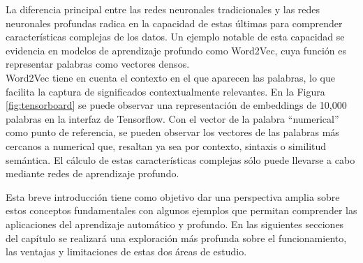 La diferencia principal entre las redes neuronales tradicionales y las redes neuronales profundas radica en la capacidad de estas últimas para comprender características complejas de los datos. Un ejemplo notable de esta capacidad se evidencia en modelos de aprendizaje profundo como Word2Vec, cuya función es representar palabras como vectores densos.\\
Word2Vec tiene en cuenta el contexto en el que aparecen las palabras, lo que facilita la captura de significados contextualmente relevantes. En la Figura \ref{fig:tensorboard}  se puede observar una representación de embeddings de 10,000 palabras en la interfaz de Tensorflow. Con el vector de la palabra ``numerical'' como punto de referencia, se pueden observar los vectores de las palabras más cercanos a numerical que, resaltan ya sea por contexto, sintaxis o similitud semántica. El cálculo de estas características complejas sólo puede llevarse a cabo mediante redes de aprendizaje profundo. 

Esta breve introducción tiene como objetivo dar una perspectiva amplia sobre estos conceptos fundamentales con algunos ejemplos que permitan comprender las aplicaciones del aprendizaje automático y profundo. En las siguientes secciones del capítulo se realizará una exploración más profunda sobre el funcionamiento, las ventajas y limitaciones de estas dos áreas de estudio.


